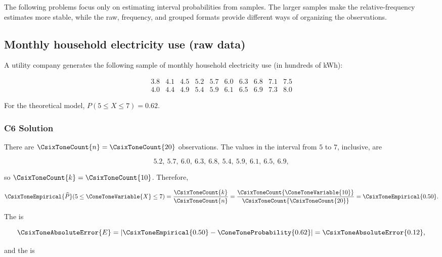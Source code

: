 The following problems focus only on estimating interval probabilities from
samples. The larger samples make the relative-frequency estimates more stable,
while the raw, frequency, and grouped formats provide different ways of
organizing the observations.

\subsection{Monthly household electricity use (raw data)}
\label{sec:c6-only-raw}

A utility company generates the following sample of monthly household
electricity use (in hundreds of kWh):

\[
\begin{array}{cccccccccc}
	3.8 & 4.1 & 4.5 & 5.2 & 5.7 & 6.0 & 6.3 & 6.8 & 7.1 & 7.5 \\
	4.0 & 4.4 & 4.9 & 5.4 & 5.9 & 6.1 & 6.5 & 6.9 & 7.3 & 8.0
\end{array}
\]

For the theoretical model,
$P(5\leq X\leq7)=0.62$.


\subsubsection*{C6 Solution}
\label{subsec:c6-only-raw-solution}

There are $\CsixToneCount{n}=\CsixToneCount{20}$ observations. The values in the interval from $5$ to $7$,
inclusive, are

\[
5.2,\ 5.7,\ 6.0,\ 6.3,\ 6.8,\ 5.4,\ 5.9,\ 6.1,\ 6.5,\ 6.9,
\]

so $\CsixToneCount{k}=\CsixToneCount{10}$. Therefore,

\[
\CsixToneEmpirical{\widehat P}(5\leq \ConeToneVariable{X}\leq7)=\frac{\CsixToneCount{k}}{\CsixToneCount{n}}=\frac{\CsixToneCount{\ConeToneVariable{10}}}{\CsixToneCount{\CsixToneCount{20}}}=\CsixToneEmpirical{0.50}.
\]

The   is

\[
\CsixToneAbsoluteError{E}=|\CsixToneEmpirical{0.50}-\ConeToneProbability{0.62}|=\CsixToneAbsoluteError{0.12},
\]

and the   is


